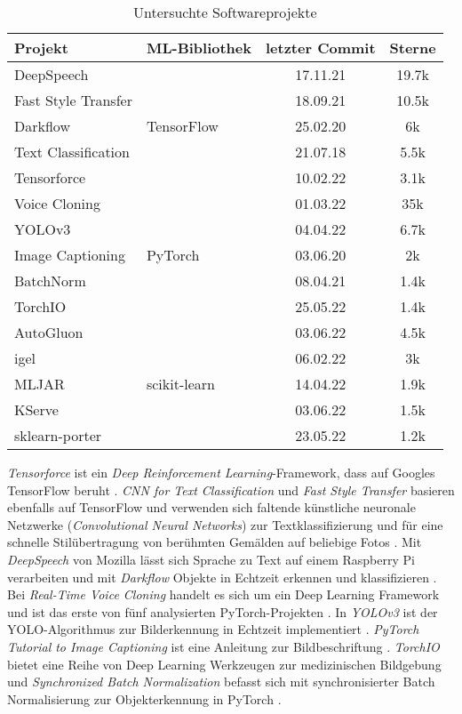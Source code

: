 \documentclass[german,bachelor]{swsLeipzig}
\begin{document}
\begin{table}[H]
\small
\begin{center}
\begin{tabular}[h]{l|l|c|c}
\hline
Projekt & ML-Bibliothek & letzter Commit & Sterne \\
\hline \hline
DeepSpeech & \multirow{5}{*}{TensorFlow} & 17.11.21 & 19.7k\\
Fast Style Transfer & & 18.09.21 & 10.5k \\
Darkflow & & 25.02.20 & 6k \\
Text Classification & & 21.07.18 & 5.5k \\
Tensorforce & & 10.02.22 & 3.1k \\
\hline
Voice Cloning & \multirow{5}{*}{PyTorch} & 01.03.22 & 35k\\
YOLOv3 & & 04.04.22 & 6.7k \\
Image Captioning & & 03.06.20 & 2k \\
BatchNorm & & 08.04.21 & 1.4k \\
TorchIO & & 25.05.22 & 1.4k \\
\hline
AutoGluon & \multirow{5}{*}{scikit-learn} & 03.06.22 & 4.5k\\
igel & & 06.02.22 & 3k \\
MLJAR & & 14.04.22 & 1.9k \\
KServe & & 03.06.22 & 1.5k \\
sklearn-porter & & 23.05.22 & 1.2k \\
\hline
\end{tabular}
\caption{Untersuchte Softwareprojekte} \label{projekte}
\end{center}
\end{table}

\textit{Tensorforce} ist ein \textit{Deep Reinforcement Learning}-Framework, dass auf Googles TensorFlow beruht \cite[]{tensorforce}.
\textit{CNN for Text Classification} und \textit{Fast Style Transfer} basieren ebenfalls auf TensorFlow und verwenden
sich faltende künstliche neuronale Netzwerke (\textit{Convolutional Neural Networks}) zur Textklassifizierung \cite[]{CNN_for_Text_Classification} und für eine
schnelle Stilübertragung von berühmten Gemälden auf beliebige Fotos \cite[]{Fast_Style_Transfer}.
Mit \textit{DeepSpeech} von Mozilla lässt sich Sprache zu Text auf einem Raspberry Pi verarbeiten \cite[]{DeepSpeech} und mit
\textit{Darkflow} Objekte in Echtzeit erkennen und klassifizieren \cite[]{Darkflow}.\\

Bei \textit{Real-Time Voice Cloning} handelt es sich um ein Deep Learning Framework und ist das erste von fünf
analysierten PyTorch-Projekten \cite[]{Charles2013}.
In \textit{YOLOv3} ist der YOLO-Algorithmus zur Bilderkennung in Echtzeit implementiert \cite[]{YOLO_v3}.
\textit{PyTorch Tutorial to Image Captioning} ist eine Anleitung zur Bildbeschriftung \cite[]{a_PyTorch_Tutorial_to_Image_Captioning}.
\textit{TorchIO} bietet eine Reihe von Deep Learning Werkzeugen zur medizinischen Bildgebung \cite[]{perez-garcia_torchio_2021}
und \textit{Synchronized Batch Normalization} befasst sich mit synchronisierter Batch Normalisierung zur
Objekterkennung in PyTorch \cite[]{Synchronized_Batchnorm}.\\
\end{document}
